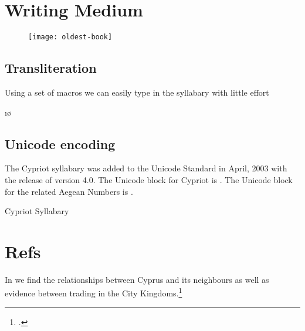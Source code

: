 \section{Writing Medium}
\lorem\lorem\lorem

\begin{figure}[htbp]
\centering

\texttt{[image: oldest-book]}

\end{figure}

\subsection{Transliteration}
Using a set of macros we can easily type in the syllabary with little effort

{\Large\startCypriote \a{\arial-}\i\o  \te\ta\po\to\to\li\ne\e\ta\li \stopCypriote}


\subsection{Unicode encoding}
The Cypriot syllabary was added to the Unicode Standard in April, 2003 with the release of version 4.0.
The Unicode block for Cypriot is . The Unicode block for the related Aegean Numbers is .



\begin{scriptexample}[]{Cypriot Syllabary}

\cypriote {}
\end{scriptexample}


\section{Refs}

In \cite{Reyes1994} we find the relationships between Cyprus and its neighbours as well as evidence between trading in the City Kingdoms.\footcite[See pages 5-34]{Reyes1994}






\endinput

\bgroup
\newfontfamily\ipafont{Charis SIL}

\ipafont


